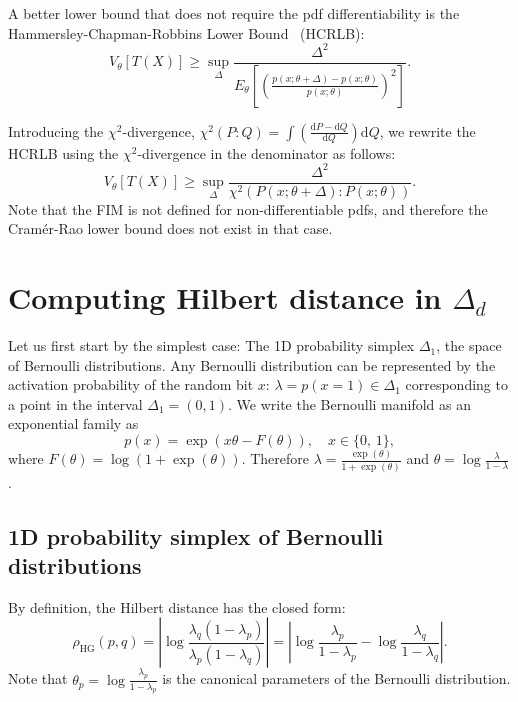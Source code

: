 \documentclass[graybox]{svmult}
\def\dP{{\mathrm{d}P}}
\def\dQ{{\mathrm{d}Q}}
\begin{document}
A better lower bound that does not require the pdf differentiability is the Hammersley-Chapman-Robbins Lower Bound~\cite{Hammersley-1950,ChapmanRobbins-1951} (HCRLB):
\begin{equation}
V_\theta[T(X)]\geq \sup_\Delta \frac{\Delta^2}{E_\theta\left[\left(\frac{p(x;\theta+\Delta)-p(x;\theta)}{p(x;\theta)}\right)^2\right]}.
\end{equation}

Introducing the $\chi^2$-divergence, $\chi^2(P:Q)=\int \left(\frac{\dP-\dQ}{\dQ}\right) \dQ$, we rewrite the HCRLB 
using the  $\chi^2$-divergence in the denominator as follows:
\begin{equation}
V_\theta[T(X)]\geq \sup_\Delta \frac{\Delta^2}{\chi^2(P(x;\theta+\Delta):P(x;\theta))}.
\end{equation}
Note that the FIM is not defined for non-differentiable pdfs, and therefore the Cram\'er-Rao lower bound does not exist in that case. 

\section{Computing Hilbert distance in $\Delta_d$}\label{sec:dist}

Let us first start by the simplest case: The 1D probability simplex $\Delta_1$,
the space of Bernoulli distributions.
Any Bernoulli distribution can be represented by the activation
probability of the random bit $x$: $\lambda=p(x=1)\in\Delta_1$
corresponding to a point in the interval $\Delta_1=(0,1)$. We write the
Bernoulli manifold as an exponential family as
$$
p(x) = \exp\left(x \theta - F(\theta) \right),\quad{}x\in\{0,\,1\},
$$
where $F(\theta)=\log(1+\exp(\theta))$. Therefore
$\lambda=\frac{\exp(\theta)}{1+\exp(\theta)}$ and $\theta=\log\frac{\lambda}{1-\lambda}$.

\subsection{1D probability simplex of Bernoulli distributions}

By definition, the Hilbert distance has the closed form:
$$
\rho_{\mathrm{HG}}(p,q)
= \left\vert\log\frac{\lambda_q(1-\lambda_p)}{\lambda_p(1-\lambda_q)}\right\vert
= \left\vert\log\frac{\lambda_p}{1-\lambda_p}-\log\frac{\lambda_q}{1-\lambda_q}\right\vert.
$$
Note that $\theta_p=\log\frac{\lambda_p}{1-\lambda_p}$ is the canonical parameters of the Bernoulli distribution.
\end{document}

